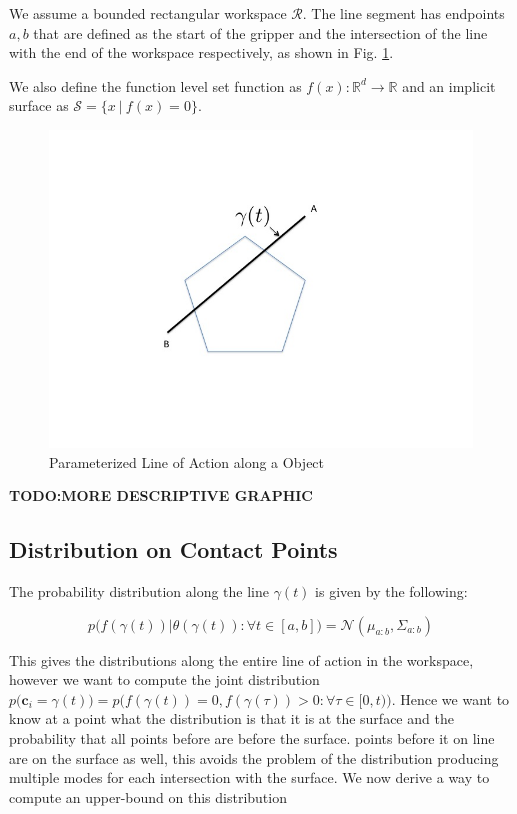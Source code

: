 \documentclass[letterpaper, 10 pt, conference]{ieeeconf}  %
\newcommand{\mN}{\mathcal{N}}
\begin{document}
We assume a bounded rectangular workspace $\mathcal{R}$.
The line segment has endpoints $a,b$ that are defined as the start of the gripper and the intersection of the line with the end of the workspace respectively, as shown in Fig. 
 \ref{fig:line_of_action}.

 We also define the function level set function as $f(x): \mathbb{R}^d \rightarrow \mathbb{R}$ and an implicit surface as $\mathcal{S} = \{ x \ | \ f(x) = 0 \}$.


\begin{figure}[ht!]
\centering
\includegraphics[scale = 0.3]{figures/Slide1.jpg}
\caption{Parameterized Line of Action along a Object}
\vspace*{-10pt}
\label{fig:line_of_action}
\end{figure}
\textbf{TODO:MORE DESCRIPTIVE GRAPHIC}
\subsection{Distribution on Contact Points} The probability distribution along the line $\gamma(t)$ is given by the following:

\begin{equation}
p\big(f(\gamma(t))|\theta(\gamma(t)): \forall t \in [a,b] \big) 
=
\mN(\mu_{a:b},\Sigma_{a:b})
\end{equation}

This gives the distributions along the entire line of action in the workspace, however we want to compute the joint distribution   $p\big(\textbf{c}_i= \gamma(t)\big) = p\big(f(\gamma(t))=0, f(\gamma(\tau))> 0: \forall \tau \in [0,t)\big)$. Hence we want to know at a point what the distribution  is that it is at the surface and the probability that all points before are before the surface. points before it on line are on the surface as well, this avoids the problem of the distribution producing multiple modes for each intersection with the surface. We now derive a way to compute an upper-bound on this distribution 
\end{document}
